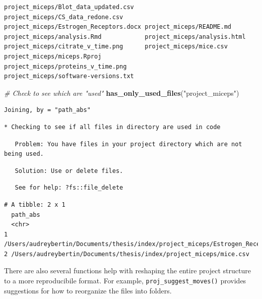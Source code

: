 \documentclass[12pt,twoside]{reedthesis}
\newenvironment{Shaded}{\begin{snugshade}}{\end{snugshade}}
\newcommand{\KeywordTok}[1]{\textcolor[rgb]{0.13,0.29,0.53}{\textbf{#1}}}
\newcommand{\StringTok}[1]{\textcolor[rgb]{0.31,0.60,0.02}{#1}}
\newcommand{\CommentTok}[1]{\textcolor[rgb]{0.56,0.35,0.01}{\textit{#1}}}
\newcommand{\NormalTok}[1]{#1}
\begin{document}
\begin{verbatim}
project_miceps/Blot_data_updated.csv   project_miceps/CS_data_redone.csv      
project_miceps/Estrogen_Receptors.docx project_miceps/README.md               
project_miceps/analysis.Rmd            project_miceps/analysis.html           
project_miceps/citrate_v_time.png      project_miceps/mice.csv                
project_miceps/miceps.Rproj            project_miceps/proteins_v_time.png     
project_miceps/software-versions.txt   
\end{verbatim}
\begin{Shaded}
\begin{Highlighting}[]
\CommentTok{# Check to see which are "used"}
\KeywordTok{has_only_used_files}\NormalTok{(}\StringTok{"project_miceps"}\NormalTok{)}
\end{Highlighting}
\end{Shaded}
\begin{verbatim}
Joining, by = "path_abs"
\end{verbatim}
\begin{verbatim}
* Checking to see if all files in directory are used in code
\end{verbatim}
\begin{verbatim}
   Problem: You have files in your project directory which are not being used.
\end{verbatim}
\begin{verbatim}
   Solution: Use or delete files.
\end{verbatim}
\begin{verbatim}
   See for help: ?fs::file_delete
\end{verbatim}
\begin{verbatim}
# A tibble: 2 x 1
  path_abs                                                                      
  <chr>                                                                         
1 /Users/audreybertin/Documents/thesis/index/project_miceps/Estrogen_Receptors.~
2 /Users/audreybertin/Documents/thesis/index/project_miceps/mice.csv            
\end{verbatim}
\normalsize

There are also several functions help with reshaping the entire project
structure to a more reproducibile format. For example,
\texttt{proj\_suggest\_moves()} provides suggestions for how to
reorganize the files into folders.
\end{document}
